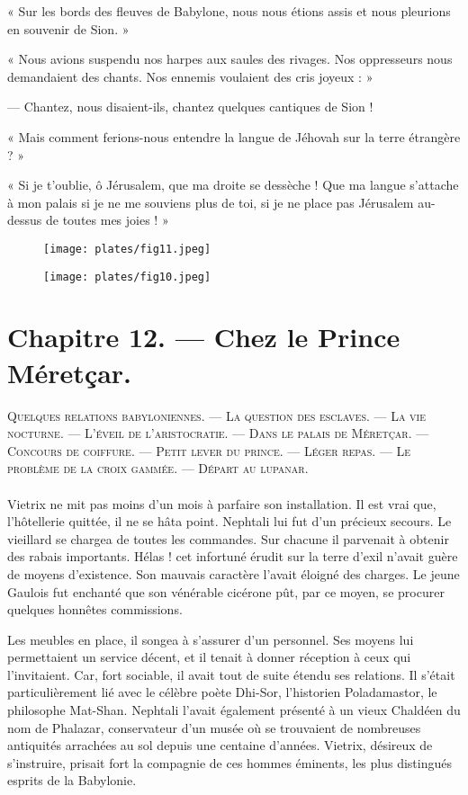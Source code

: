 \documentclass[a4paper, 11pt, oneside, polutonikogreek, french]{article}
\begin{document}
« Sur les bords des fleuves de Babylone, nous nous étions assis et nous pleurions en souvenir de Sion. »

« Nous avions suspendu nos harpes aux saules des rivages. Nos oppresseurs nous demandaient des chants. Nos ennemis voulaient des cris joyeux : »

--- Chantez, nous disaient-ils, chantez quelques cantiques de Sion !

« Mais comment ferions-nous entendre la langue de Jéhovah sur la terre étrangère ? »

« Si je t'oublie, ô Jérusalem, que ma droite se dessèche ! Que ma langue s'attache à mon palais si je ne me souviens plus de toi, si je ne place pas Jérusalem au-dessus de toutes mes joies ! »

\begin{figure}[H]
\centering
\texttt{[image: plates/fig11.jpeg]}
\end{figure}
\clearpage
\begin{figure}[H]
\centering
\texttt{[image: plates/fig10.jpeg]}
\end{figure}
\section{Chapitre 12. --- Chez le Prince Méretçar.}
\begin{center}
\scshape
\small
Quelques relations babyloniennes. --- La question des esclaves. --- La vie nocturne. --- L'éveil de l'aristocratie. --- Dans le palais de Méretçar. --- Concours de coiffure. --- Petit lever du prince. --- Léger repas. --- Le problème de la croix gammée. --- Départ au lupanar.
\end{center}
\paragraph{}
Vietrix ne mit pas moins d'un mois à parfaire son installation. Il est vrai que, l'hôtellerie quittée, il ne se hâta point. Nephtali lui fut d'un précieux secours. Le vieillard se chargea de toutes les commandes. Sur chacune il parvenait à obtenir des rabais importants. Hélas ! cet infortuné érudit sur la terre d'exil n'avait guère de moyens d'existence. Son mauvais caractère l'avait éloigné des charges. Le jeune Gaulois fut enchanté que son vénérable cicérone pût, par ce moyen, se procurer quelques honnêtes commissions.

Les meubles en place, il songea à s'assurer d'un personnel. Ses moyens lui permettaient un service décent, et il tenait à donner réception à ceux qui l'invitaient. Car, fort sociable, il avait tout de suite étendu ses relations. Il s'était particulièrement lié avec le célèbre poète Dhi-Sor, l'historien Poladamastor, le philosophe Mat-Shan. Nephtali l'avait également présenté à un vieux Chaldéen du nom de Phalazar, conservateur d'un musée où se trouvaient de nombreuses antiquités arrachées au sol depuis une centaine d'années. Vietrix, désireux de s'instruire, prisait fort la compagnie de ces hommes éminents, les plus distingués esprits de la Babylonie.
\end{document}
